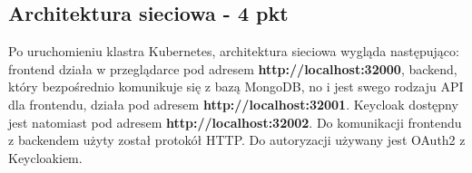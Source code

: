 \documentclass[12pt,a4paper]{article}
\begin{document}
\subsection{Architektura sieciowa - 4 pkt}
\label{sec:ExampleResults}

Po uruchomieniu klastra Kubernetes, architektura sieciowa wygląda następująco:
frontend działa w przeglądarce pod adresem \textbf{http://localhost:32000}, backend, który bezpośrednio komunikuje się z bazą MongoDB, no i jest swego rodzaju API dla frontendu, działa pod adresem \textbf{http://localhost:32001}. Keycloak dostępny jest natomiast pod adresem \textbf{http://localhost:32002}. Do komunikacji frontendu z backendem użyty został protokół HTTP. Do autoryzacji używany jest OAuth2 z Keycloakiem. 
\end{document}
